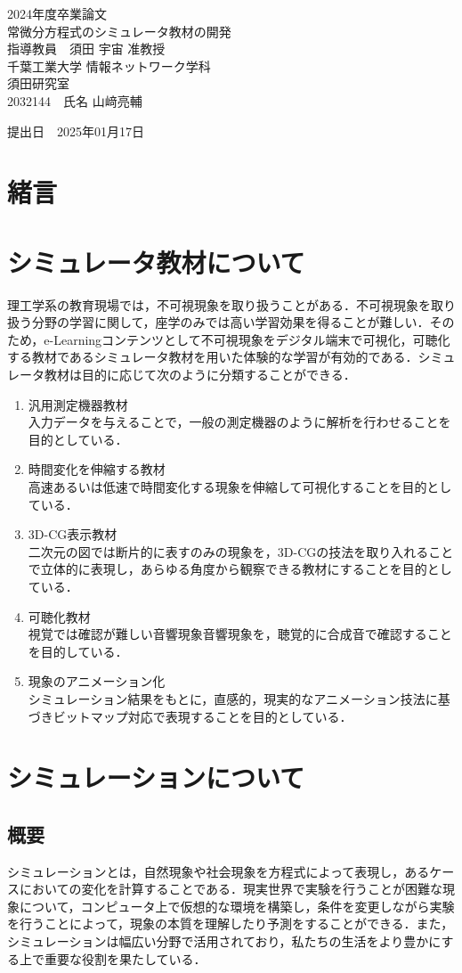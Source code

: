 \documentclass[a4paper, 12pt]{ltjsarticle}
\newcommand{\coverpage}{
\begin{titlepage}
\begin{center}
\vspace*{1.5cm}

{\LARGE 2024年度卒業論文}\\[2cm] %

{\Huge {常微分方程式のシミュレータ教材の開発}}\\[4cm] %

{\LARGE 指導教員　須田 宇宙 准教授}\\[2cm] %
{\LARGE 千葉工業大学 情報ネットワーク学科}\\[0.5cm] %

{\LARGE 須田研究室}\\[2.5cm] %

{\LARGE {2032144}　氏名 {山﨑亮輔}} \\[1.5cm] %

\vfill
\end{center}

\begin{flushright}
{\LARGE 提出日　\textnormal{2025年01月17日}}\\[1.5cm] %
\end{flushright}

\vfill
\end{titlepage}
}
\begin{document}
\coverpage

\tableofcontents

\clearpage

\section{緒言}
\clearpage
\section{シミュレータ教材について}
理工学系の教育現場では，不可視現象を取り扱うことがある．不可視現象を取り扱う分野の学習に関して，座学のみでは高い学習効果を得ることが難しい．そのため，e-Learningコンテンツとして不可視現象をデジタル端末で可視化，可聴化する教材であるシミュレータ教材を用いた体験的な学習が有効的である．シミュレータ教材は目的に応じて次のように分類することができる．
\begin{enumerate}
\item 汎用測定機器教材\\
入力データを与えることで，一般の測定機器のように解析を行わせることを目的としている．
\item 時間変化を伸縮する教材\\
高速あるいは低速で時間変化する現象を伸縮して可視化することを目的としている．
\item 3D-CG表示教材\\
二次元の図では断片的に表すのみの現象を，3D-CGの技法を取り入れることで立体的に表現し，あらゆる角度から観察できる教材にすることを目的としている．
\item 可聴化教材\\
視覚では確認が難しい音響現象音響現象を，聴覚的に合成音で確認することを目的している．
\item 現象のアニメーション化\\
シミュレーション結果をもとに，直感的，現実的なアニメーション技法に基づきビットマップ対応で表現することを目的としている．
\end{enumerate}
\clearpage
\section{シミュレーションについて}
\subsection{概要}
シミュレーションとは，自然現象や社会現象を方程式によって表現し，あるケースにおいての変化を計算することである．現実世界で実験を行うことが困難な現象について，コンピュータ上で仮想的な環境を構築し，条件を変更しながら実験を行うことによって，現象の本質を理解したり予測をすることができる．また，シミュレーションは幅広い分野で活用されており，私たちの生活をより豊かにする上で重要な役割を果たしている．
\end{document}
